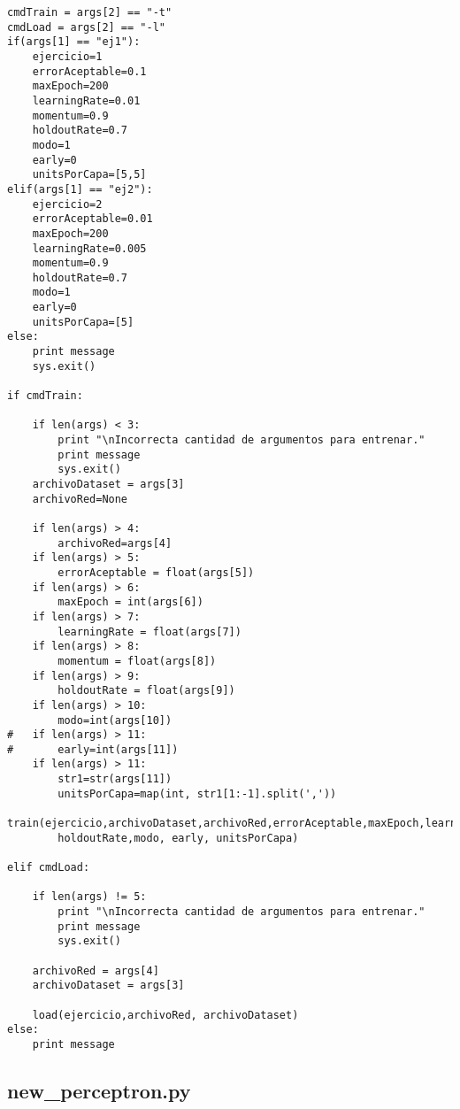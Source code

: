 \begin{lstlisting}[caption=main.py]
cmdTrain = args[2] == "-t"
cmdLoad = args[2] == "-l"
if(args[1] == "ej1"):
	ejercicio=1
	errorAceptable=0.1
	maxEpoch=200
	learningRate=0.01
	momentum=0.9
	holdoutRate=0.7
	modo=1
	early=0
	unitsPorCapa=[5,5]
elif(args[1] == "ej2"):
	ejercicio=2
	errorAceptable=0.01
	maxEpoch=200
	learningRate=0.005
	momentum=0.9
	holdoutRate=0.7
	modo=1
	early=0
	unitsPorCapa=[5]
else:
	print message
	sys.exit()

if cmdTrain:
	
	if len(args) < 3:
		print "\nIncorrecta cantidad de argumentos para entrenar."
		print message
		sys.exit()
	archivoDataset = args[3]
	archivoRed=None

	if len(args) > 4:
		archivoRed=args[4]
	if len(args) > 5:
		errorAceptable = float(args[5])
	if len(args) > 6:
		maxEpoch = int(args[6])
	if len(args) > 7:
		learningRate = float(args[7])
	if len(args) > 8:
		momentum = float(args[8])
	if len(args) > 9:
		holdoutRate = float(args[9])
	if len(args) > 10:
		modo=int(args[10])
#	if len(args) > 11:
#		early=int(args[11])
	if len(args) > 11:
		str1=str(args[11])
		unitsPorCapa=map(int, str1[1:-1].split(','))
	train(ejercicio,archivoDataset,archivoRed,errorAceptable,maxEpoch,learningRate,momentum,
		holdoutRate,modo, early, unitsPorCapa)

elif cmdLoad:
	
	if len(args) != 5:
		print "\nIncorrecta cantidad de argumentos para entrenar."
		print message
		sys.exit()
		
	archivoRed = args[4]
	archivoDataset = args[3]
	
	load(ejercicio,archivoRed, archivoDataset)
else:
	print message

\end{lstlisting}

\newpage
\subsection{new\_perceptron.py}

